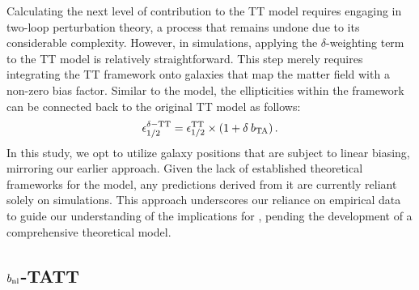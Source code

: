 Calculating the next level of contribution to the TT model requires engaging in two-loop perturbation theory, a process that remains undone due to its considerable complexity.
However, in simulations, applying the $\delta$-weighting term to the TT model is relatively straightforward.
This step merely requires integrating the TT framework onto galaxies that map the matter field with a non-zero bias factor. 
Similar to the \dNLA model, the ellipticities within the \dTT framework can be connected back to the original TT model as follows:
\begin{eqnarray}
\epsilon_{1/2}^{\delta-\rm TT} = \epsilon_{1/2}^{\rm TT}\times(1 + \delta \: b_{\rm TA}) \, .
\label{eq:tidal_th_deltaTT}
\end{eqnarray}
In this study, we opt to utilize galaxy positions that are subject to linear biasing, mirroring our earlier approach.
Given the lack of established theoretical frameworks for the \dTT model, any predictions derived from it are currently reliant solely on simulations.
 This approach underscores our reliance on empirical data to guide our understanding of the implications for \dTT, pending the development of a comprehensive theoretical model.

 
\subsection{$b_{\rm nl}$-TATT}
\label{subsec:HOD-TATT}


